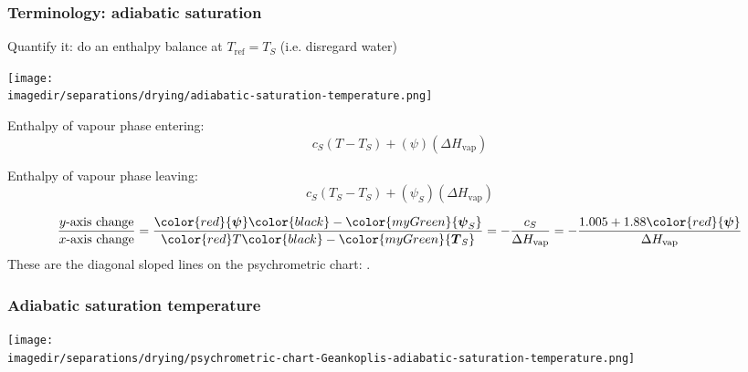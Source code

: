 \begin{frame}\frametitle{Terminology: adiabatic saturation}
	Quantify it: do an enthalpy balance at $T_\text{ref} = T_S$ {\scriptsize (i.e. disregard water)}
	\begin{center}
		\texttt{[image: \\imagedir/separations/drying/adiabatic-saturation-temperature.png]}
	\end{center}
	\vspace{-6pt}
	\begin{exampleblock}{Enthalpy of vapour phase entering:}
		\[c_S\left(T - T_S \right) + (\psi) (\Delta H_\text{vap})\]
	\end{exampleblock}
	\begin{exampleblock}{Enthalpy of vapour phase leaving:}
		\[c_S\left(T_S - T_S \right) + (\psi_S) (\Delta H_\text{vap})\]
	\end{exampleblock}
	
	\[	
		\displaystyle \frac{y\text{-axis change}}{x\text{-axis change}} = \frac{\color{red}{\boldsymbol \psi} \color{black} - \color{myGreen}{\boldsymbol \psi_S}}{\color{red}T \color{black}- \color{myGreen}{\boldsymbol T_S}} = - \frac{c_S}{\Delta H_\text{vap}} = - \frac{1.005 + 1.88 \color{red}{\boldsymbol \psi}}{\Delta H_\text{vap}}
	\]
	These are the diagonal sloped lines on the psychrometric chart: {\color{purple}{adiabatic saturation curves}}.
\end{frame}

\begin{frame}\frametitle{Adiabatic saturation temperature}
	\vfill
	\begin{center}
		\texttt{[image: \\imagedir/separations/drying/psychrometric-chart-Geankoplis-adiabatic-saturation-temperature.png]}
	\end{center}
\end{frame}

